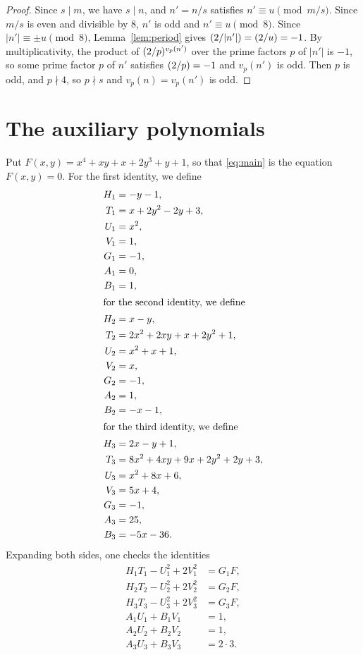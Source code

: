 \documentclass[11pt]{article}
\newcommand{\leg}[2]{\mathchoice{\biggl(\dfrac{#1}{#2}\biggr)}{(#1/#2)}{(#1/#2)}{(#1/#2)}}
\begin{document}
\begin{proof}
Since $s\mid m$, we have $s\mid n$, and $n'=n/s$ satisfies $n'\equiv u\pmod{m/s}$. Since $m/s$ is even and divisible by $8$, $n'$ is odd and $n'\equiv u\pmod{8}$. Since $|n'|\equiv\pm u\pmod{8}$, Lemma~\ref{lem:period} gives $\leg{2}{|n'|}=\leg{2}{u}=-1$. By multiplicativity, the product of $\leg{2}{p}^{v_p(n')}$ over the prime factors $p$ of $|n'|$ is $-1$, so some prime factor $p$ of $n'$ satisfies $\leg{2}{p}=-1$ and $v_p(n')$ is odd. Then $p$ is odd, and $p\nmid4$, so $p\nmid s$ and $v_p(n)=v_p(n')$ is odd.
\end{proof}

\section{The auxiliary polynomials}

Put $F(x,y)=x^{4}+xy+x+2y^{3}+y+1$, so that \eqref{eq:main} is the equation $F(x,y)=0$.
For the first identity, we define
\begin{align*}
H_{1}&=-y-1,\\
T_{1}&=x+2y^{2}-2y+3,\\
U_{1}&=x^{2},\\
V_{1}&=1,\\
G_{1}&=-1,\\
A_{1}&=0,\\
B_{1}&=1,\\
\intertext{for the second identity, we define}
H_{2}&=x-y,\\
T_{2}&=2x^{2}+2xy+x+2y^{2}+1,\\
U_{2}&=x^{2}+x+1,\\
V_{2}&=x,\\
G_{2}&=-1,\\
A_{2}&=1,\\
B_{2}&=-x-1,\\
\intertext{for the third identity, we define}
H_{3}&=2x-y+1,\\
T_{3}&=8x^{2}+4xy+9x+2y^{2}+2y+3,\\
U_{3}&=x^{2}+8x+6,\\
V_{3}&=5x+4,\\
G_{3}&=-1,\\
A_{3}&=25,\\
B_{3}&=-5x-36.
\end{align*}
Expanding both sides, one checks the identities
\begin{align}
H_{1}T_{1}-U_{1}^2+2V_{1}^2&=G_{1}F,\label{eq:norm1}\\
H_{2}T_{2}-U_{2}^2+2V_{2}^2&=G_{2}F,\label{eq:norm2}\\
H_{3}T_{3}-U_{3}^2+2V_{3}^2&=G_{3}F,\label{eq:norm3}\\
A_{1}U_{1}+B_{1}V_{1}&=1,\label{eq:bez1}\\
A_{2}U_{2}+B_{2}V_{2}&=1,\label{eq:bez2}\\
A_{3}U_{3}+B_{3}V_{3}&=2\cdot 3.\label{eq:bez3}
\end{align}
\end{document}
